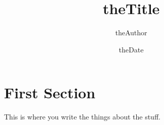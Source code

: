 \documentclass{article}
\title{theTitle}
\author{theAuthor} %
\date{theDate}
\begin{document}
\section{First Section}

This is where you write the things about the stuff.
\end{document}
